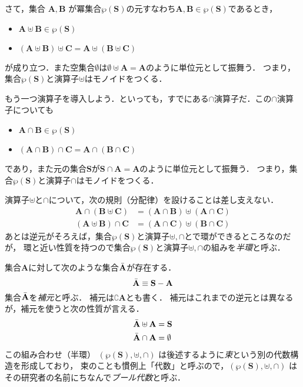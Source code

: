 \documentclass{jsbook}
\newcommand{\keyword}[1]{\emph{#1}}
\newcommand{\bg}[1]{\mathbf{#1}}
\begin{document}
さて，集合 $\bg{A},\bg{B}$ が冪集合$\wp(\bg{S})$の元すなわち$\bg{A},\bg{B}\in\wp(\bg{S})$であるとき，
\begin{itemize}
\item $\bg{A}\uplus\bg{B}\in\wp(\bg{S})$
\item $(\bg{A}\uplus\bg{B})\uplus\bg{C}=\bg{A}\uplus(\bg{B}\uplus\bg{C})$
\end{itemize}
が成り立つ．また空集合$\emptyset$は$\emptyset\uplus\bg{A}=\bg{A}$のように単位元として振舞う．
つまり，集合$\wp(\bg{S})$と演算子$\uplus$はモノイドをつくる．

もう一つ演算子を導入しよう．といっても，すでにある$\cap$演算子だ．この$\cap$演算子についても
\begin{itemize}
\item $\bg{A}\cap\bg{B}\in\wp(\bg{S})$
\item $(\bg{A}\cap\bg{B})\cap\bg{C}=\bg{A}\cap(\bg{B}\cap\bg{C})$
\end{itemize}
であり，また元の集合$\bg{S}$が$\bg{S}\cap\bg{A}=\bg{A}$のように単位元として振舞う．
つまり，集合$\wp(\bg{S})$と演算子$\cap$はモノイドをつくる．

演算子$\uplus$と$\cap$について，次の規則（分配律）を設けることは差し支えない．
\begin{align}
\bg{A}\cap(\bg{B}\uplus\bg{C})&=(\bg{A}\cap\bg{B})\uplus(\bg{A}\cap\bg{C})\\
(\bg{A}\uplus\bg{B})\cap\bg{C}&=(\bg{A}\cap\bg{C})\uplus(\bg{B}\cap\bg{C})
\end{align}
あとは逆元がそろえば，集合$\wp(\bg{S})$と演算子$\uplus,\cap$とで環ができるところなのだが，
環と近い性質を持つので集合$\wp(\bg{S})$と演算子$\uplus,\cap$の組みを\keyword{半環}と呼ぶ．

集合$\bg{A}$に対して次のような集合$\Bar{\bg{A}}$が存在する．
\begin{equation}
\Bar{\bg{A}}\equiv\bg{S}-\bg{A}
\end{equation}
集合$\Bar{\bg{A}}$を\keyword{補元}と呼ぶ．
補元は$\complement\bg{A}$とも書く．
補元はこれまでの逆元とは異なるが，補元を使うと次の性質が言える．
\begin{align}
\Bar{\bg{A}}\uplus\bg{A}&=\bg{S}\\
\Bar{\bg{A}}\cap\bg{A}&=\emptyset
\end{align}
この組み合わせ（半環） $(\wp(\bg{S}),\uplus,\cap)$ は後述するように\keyword{束}という別の代数構造を形成しており，
束のことも慣例上「代数」と呼ぶので，$(\wp(\bg{S}),\uplus,\cap)$ はその研究者の名前にちなんで\keyword{ブール代数}と呼ぶ．
\end{document}
